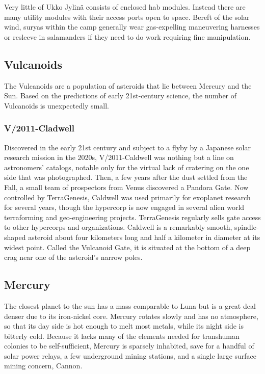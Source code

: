 Very little of Ukko Jylinä consists of enclosed hab modules. Instead there are many utility modules with their access ports open to space. Bereft of the solar wind, suryas within the camp generally wear gas-expelling maneuvering harnesses or resleeve in salamanders if they need to do work requiring fine manipulation. 

\subsection{Vulcanoids} \label{sec:vulcanoids} 

The Vulcanoids are a population of asteroids that lie between Mercury and the Sun. Based on the predictions of early 21st-century science, the number of Vulcanoids is unexpectedly small. 

\subsubsection{V/2011-Cladwell} \label{sec:v2011-caldw} 

Discovered in the early 21st century and subject to a flyby by a Japanese solar research mission in the 2020s, V/2011-Caldwell was nothing but a line on astronomers' catalogs, notable only for the virtual lack of cratering on the one side that was photographed. Then, a few years after the dust settled from the Fall, a small team of prospectors from Venus discovered a Pandora Gate. Now controlled by TerraGenesis, Caldwell was used primarily for exoplanet research for several years, though the hypercorp is now engaged in several alien world terraforming and geo-engineering projects. TerraGenesis regularly sells gate access to other hypercorps and organizations. Caldwell is a remarkably smooth, spindle-shaped asteroid about four kilometers long and half a kilometer in diameter at its widest point. Called the Vulcanoid Gate, it is situated at the bottom of a deep crag near one of the asteroid's narrow poles. 

\subsection{Mercury} \label{sec:mercury} 

The closest planet to the sun has a mass comparable to Luna but is a great deal denser due to its iron-nickel core. Mercury rotates slowly and has no atmosphere, so that its day side is hot enough to melt most metals, while its night side is bitterly cold. Because it lacks many of the elements needed for transhuman colonies to be self-sufficient, Mercury is sparsely inhabited, save for a handful of solar power relays, a few underground mining stations, and a single large surface mining concern, Cannon. 

